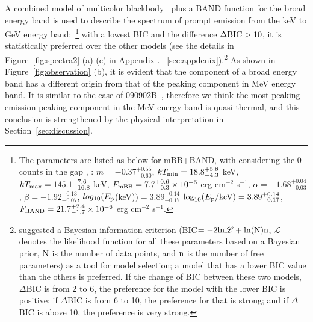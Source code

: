 \documentclass[linenumbers,twocolumn]{aastex631}
\providecommand{\DIFaddtex}[1]{{\protect\color{blue} \sf #1}} %
\providecommand{\DIFdeltex}[1]{{\protect\color{red} \scriptsize #1}} %
\providecommand{\DIFaddbegin}{} %
\providecommand{\DIFaddend}{} %
\providecommand{\DIFdelbegin}{} %
\providecommand{\DIFdelend}{} %
\providecommand{\DIFadd}[1]{\texorpdfstring{\DIFaddtex{#1}}{#1}} %
\providecommand{\DIFdel}[1]{\texorpdfstring{\DIFdeltex{#1}}{}} %
\begin{document}
 
  A combined model of multicolor blackbody~\citep[mBB, e.g. see details in][]{2008ApJ...682..463P,2010ApJ...709L.172R,2018ApJ...866...13H} plus a BAND function for \DIFaddbegin \DIFadd{the }\DIFaddend broad energy band is used to describe the spectrum of prompt emission from \DIFaddbegin \DIFadd{the }\DIFaddend keV to GeV energy band;~\footnote{The parameters are listed as below for mBB+BAND, \DIFdelbegin \DIFdel{with }\DIFdelend considering \DIFaddbegin \DIFadd{the }\DIFaddend 0-counts in the gap\DIFdelbegin \DIFdel{, }\DIFdelend \DIFaddbegin \DIFadd{: }\DIFaddend $m=-0.37^{+0.55}_{-0.60}$, $kT_{\rm min}=18.8^{+5.8}_{-4.3}$ keV, $kT_{\rm max}=145.1^{+7.6}_{-16.8}$ keV, $F_{\rm mBB}=7.7^{+0.6}_{-0.3}\times10^{-6}$ erg cm$^{-2}$ s$^{-1}$, $\alpha=-1.68^{+0.04}_{-0.03}$, $\beta=-1.92^{+0.13}_{-0.07}$, \DIFdelbegin \DIFdel{$log_{10}(E_{\rm p}$(keV)$)=3.89^{+0.14}_{-0.17}$}\DIFdelend \DIFaddbegin \DIFadd{$\log_{10}(E_{\rm p}/{\rm keV})=3.89^{+0.14}_{-0.17}$}\DIFaddend , $F_{\rm BAND}=21.7^{+2.4}_{-1.7}\times10^{-6}$ erg cm$^{-2}$ s$^{-1}$.} with a lowest BIC and the difference $\Delta \rm{BIC}>10$, it is statistically preferred over the other models (see the details in Figure~\ref{fig:spectra2} (a)-(c) in Appendix\DIFdelbegin \DIFdel{.}\DIFdelend \DIFaddbegin \DIFadd{~}\DIFaddend \ref{sec:appdenix}).\footnote{\cite{2016MNRAS.463.1144W} suggested a Bayesian information criterion  (BIC$=-2\rm{ln} \mathscr{L} +\rm{ln} (N)n$, $\mathscr{L}$ denotes the likelihood
function for all these parameters based on a Bayesian prior, $\rm N$ is the number of data points, and $\rm n$ is the number of free parameters) as a tool for model selection; a model that has a lower BIC value than the others is preferred. If the change of BIC between these two models, $\Delta$BIC is from 2 to 6, the preference for the model with the lower BIC is positive; if $\Delta$BIC is from 6 to 10, the preference for that is strong; and if $\Delta$BIC is above 10, the preference is very strong.} 
  As shown in Figure~\ref{fig:observation} (b), it is evident that the component of a broad energy band has a different origin from that of the peaking component in MeV energy band. It is similar to the case of 090902B~\citep{2009ApJ...706L.138A, 2010ApJ...709L.172R, 2012MNRAS.420..468P}, therefore we think the \DIFdelbegin \DIFdel{most peaking emission }\DIFdelend \DIFaddbegin \DIFadd{peaking component }\DIFaddend in the MeV energy band is quasi-thermal, and this conclusion is strengthened by the physical interpretation in Section~\ref{sec:discussion}.
\end{document}
